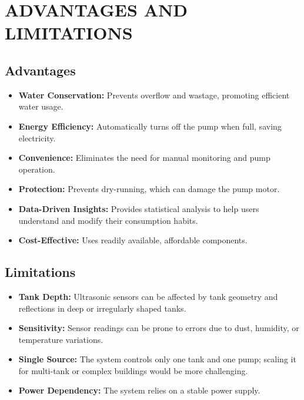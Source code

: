 \documentclass[12pt,a4paper]{article}
\begin{document}

\section{ADVANTAGES AND LIMITATIONS}

\subsection{Advantages}

\begin{itemize}
    \item \textbf{Water Conservation:} Prevents overflow and wastage, promoting efficient water usage.

    \item \textbf{Energy Efficiency:} Automatically turns off the pump when full, saving electricity.

    \item \textbf{Convenience:} Eliminates the need for manual monitoring and pump operation.

    \item \textbf{Protection:} Prevents dry-running, which can damage the pump motor.

    \item \textbf{Data-Driven Insights:} Provides statistical analysis to help users understand and modify their consumption habits.

    \item \textbf{Cost-Effective:} Uses readily available, affordable components.
\end{itemize}

\subsection{Limitations}

\begin{itemize}
    \item \textbf{Tank Depth:} Ultrasonic sensors can be affected by tank geometry and reflections in deep or irregularly shaped tanks.

    \item \textbf{Sensitivity:} Sensor readings can be prone to errors due to dust, humidity, or temperature variations.

    \item \textbf{Single Source:} The system controls only one tank and one pump; scaling it for multi-tank or complex buildings would be more challenging.

    \item \textbf{Power Dependency:} The system relies on a stable power supply.
\end{itemize}
\end{document}
